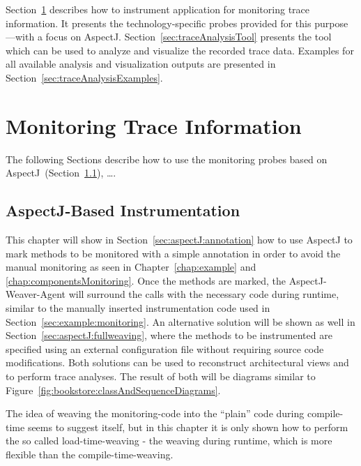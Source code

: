 \noindent Section~\ref{sec:traceMonitoring} describes how to instrument application for %
monitoring trace information. %
It presents the technology-specific probes provided for this purpose---with %
a focus on AspectJ. Section~\ref{sec:traceAnalysisTool} presents the %
tool which can be used to analyze and visualize the recorded trace %
data.  Examples for all available analysis and visualization outputs are %
presented in Section~\ref{sec:traceAnalysisExamples}.

\section{Monitoring Trace Information}\label{sec:traceMonitoring}

The following Sections describe how to use the monitoring probes based on %
AspectJ~(Section~\ref{sec:traceAnalysis:instr:AspectJ}), \ldots.

\subsection{AspectJ-Based Instrumentation}\label{sec:traceAnalysis:instr:AspectJ}

This chapter will show in Section~\ref{sec:aspectJ:annotation} how
to use AspectJ to mark methods to be monitored with a simple annotation
in order to avoid the manual monitoring as seen in Chapter~\ref{chap:example}
and \ref{chap:componentsMonitoring}. Once the methods are marked, the AspectJ-Weaver-Agent
will surround the calls with the necessary code during runtime, similar
to the manually inserted instrumentation code used in Section~\ref{sec:example:monitoring}.
An alternative solution will be shown as well in Section~\ref{sec:aspectJ:fullweaving}, %
where the methods to be instrumented are specified using an external configuration file %
without requiring source code modifications. Both solutions
can be used to reconstruct architectural views and to perform trace
analyses. The result of both will be diagrams similar to Figure~\ref{fig:bookstore:classAndSequenceDiagrams}.

The idea of weaving the monitoring-code into the ``plain'' code
during compile-time seems to suggest itself, but in this chapter it
is only shown how to perform the so called load-time-weaving - the
weaving during runtime, which is more flexible than the compile-time-weaving.

\



